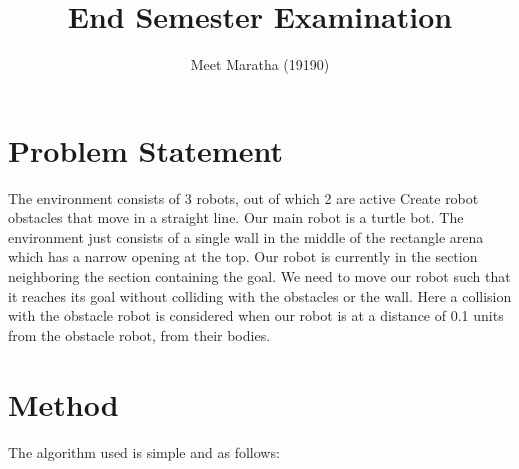 \documentclass[12pt]{article}
\begin{document}
	\title{End Semester Examination}
	\author{Meet Maratha (19190)}
	\maketitle
	\section{Problem Statement}
	The environment consists of 3 robots, out of which 2 are active Create robot obstacles that move in a straight line. Our main robot is a turtle bot. The environment just consists of a single wall in the middle of the rectangle arena which has a narrow opening at the top. Our robot is currently in the section neighboring the section containing the goal. We need to move our robot such that it reaches its goal without colliding with the obstacles or the wall. Here a collision with the obstacle robot is considered when our robot is at a distance of 0.1 units from the obstacle robot, from their bodies.
	\section{Method}
	The algorithm used is simple and as follows:
\end{document}
